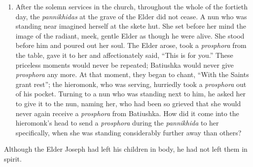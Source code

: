 \begin{enumerate}
\item After the solemn services in the church, throughout the whole of the fortieth day, the \textit{pannikhidas} at the grave of the Elder did not cease. A nun who was standing near imagined herself at the skete hut. She set before her mind the image of the radiant, meek, gentle Elder as though he were alive. She stood before him and poured out her soul. The Elder arose, took a \textit{prosphora} from the table, gave it to her and affectionately said, ``This is for you.'' These priceless moments would never be repeated; Batiushka would never give \textit{prosphora} any more. At that moment, they began to chant, ``With the Saints grant rest''; the hieromonk, who was serving, hurriedly took a \textit{prosphora} out of his pocket. Turning to a nun who was standing next to him, he asked her to give it to the nun, naming her, who had been so grieved that she would never again receive a \textit{prosphora} from Batiushka. How did it come into the hieromonk's head to send a \textit{prosphora} during the \textit{pannikhida} to her specifically, when she was standing considerably further away than others?
\end{enumerate}

Although the Elder Joseph had left his children in body, he had not left them in spirit.
